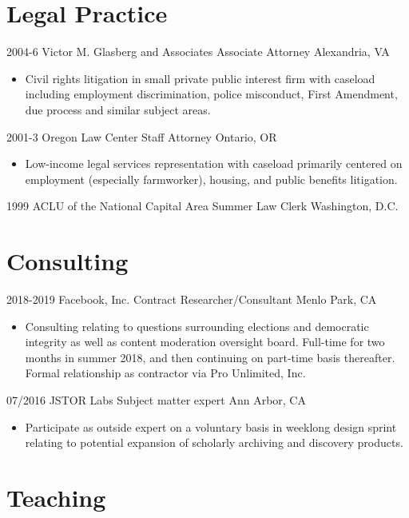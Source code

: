 \documentclass[letterpaper]{moderncv}
\begin{document}
\section{Legal Practice}

\cventry
{2004-6}
{Victor M. Glasberg and Associates}
{Associate Attorney}
{Alexandria, VA}
{}
{\begin{itemize}%
	\item Civil rights litigation in small private public interest firm with caseload including employment discrimination,
    police misconduct, First Amendment, due process and similar subject areas.
	\end{itemize}}

\cventry
{2001-3}
{Oregon Law Center}
{Staff Attorney}
{Ontario, OR}
{}
{\begin{itemize}%
	\item Low-income legal services representation with caseload primarily centered on employment
    (especially farmworker), housing, and public benefits litigation.
	\end{itemize}}

\cventry
{1999}
{ACLU of the National Capital Area}
{Summer Law Clerk}
{Washington, D.C.}
{}
{}


\section{Consulting}

\cventry
{2018-2019}
{Facebook, Inc.}
{Contract Researcher/Consultant}
{Menlo Park, CA}
{}
{\begin{itemize}%
	\item Consulting relating to questions surrounding elections and democratic
    integrity as well as content moderation oversight board. 
    Full-time for two months in summer 2018, and then continuing on
    part-time basis thereafter. Formal relationship
    as contractor via Pro Unlimited, Inc.
	\end{itemize}}

\cventry
{07/2016}
{JSTOR Labs}
{Subject matter expert}
{Ann Arbor, CA}
{}
{\begin{itemize}%
	\item Participate as outside expert on a voluntary basis in weeklong design
    sprint relating to potential expansion of scholarly archiving and discovery products.
	\end{itemize}}

\section{Teaching}
\end{document}
